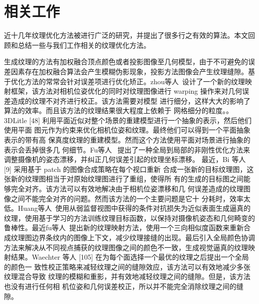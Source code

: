 \section{相关工作}
近十几年纹理优化方法被进行广泛的研究，并提出了很多行之有效的算法。本文回顾和总结一些与我们工作相关的纹理优化方法。\par
\vspace*{2mm}生成纹理的方法有加权融合顶点颜色或者投影图像至几何模型，由于不可避免的误差因素存在加权融合算法会产生模糊伪影现象，投影方法图像会产生纹理缝隙。基于优化方法的常常会针对误差项进行优化矫正。zhou等人~\cite{zhou2014color}设计了一个新的纹理映射框架，该方法对相机位姿优化的同时对纹理图像进行 warping 操作来对几何误差造成的纹理不对齐进行校正。该方法需要对模型 进行细分，这样大大的影响了算法的效率。而且该方法的纹理结果很大程度上依赖于 网格细分的粒度。。3DLitle [48] 利用平面近似对整个场景的重建模型进行一个抽象的表示，然后他们使用平面 图元作为约束来优化相机位姿和纹理。最终他们可以得到一个平面抽象表示的带有高 保真度纹理的重建模型。然而这个方法使用平面对场景进行抽象的表示会丢掉很多几 何细节。Fu等人~\cite{fu2018texture} 提出了一种全局到局部的非刚性优化方法来调整摄像机的姿态漂移，并纠正几何误差引起的纹理坐标漂移。
\vspace*{2mm}最近，Bi 等人 [9] 采用基于 patch 的图像合成策略在每个视口重新 合成一张新的目标纹理图，这张新的纹理图相当于对原始纹理图进行了重组，使得所 有的生成的目标图之间能够完全对齐。该方法可以有效地解决由于相机位姿漂移和几 何误差造成的纹理图像之间不能完全对齐的问题。然而该方法的一个主要问题是它十 分耗时，效率太低。Huang等人~\cite{JingweiHuang2020AdversarialTO}使用从弱监督视图中获得的条件对抗损失为近似表面生成逼真的纹理，使用基于学习的方法训练纹理目标函数，以保持对摄像机姿态和几何畸变的鲁棒性。最近fu等人~\cite{fu2021seamless}提出新的纹理映射方法，使用一个三向相似度函数来重新合成纹理图边界条纹内的图像上下文，减少纹理接缝的出现。最后引入全局颜色协调方法来解决从不同视点捕获的纹理图像之间的颜色不一致，生成视觉逼真的纹理映射结果。Waechter 等人 [105] 在为每个面选择一个最优的纹理之后提出一个全局的颜色一 致性校正策略来减轻纹理之间的缝隙效应，该方法可以有效地减少多张纹理混合导致 纹理的模糊和重影，并有效地减轻纹理之间的缝隙。但是，该方法也没有进行任何相 机位姿和几何误差校正，所以并不能完全消除纹理之间的缝隙。


